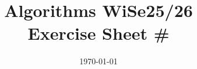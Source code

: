 \documentclass[11pt,a4paper]{article}
\title{
    \vspace{-2cm}
    \Large\textbf{Algorithms WiSe25/26}\\
    \large Exercise Sheet \#\exercisenum
    \vspace{-0.5cm}
}
\author{}  %
\date{\today}
\newcommand{\exercisenum}{X}
\begin{document}

\newcommand{\exercisetitle}[1]{%
    \newpage%
    \setcounter{page}{1}%
    \nolinenumbers%
    \thispagestyle{fancy}%
    {\centering\Large\textbf{Algorithms WiSe25/26}\par}%
    {\centering\large Exercise Sheet \#\exercisenum\par}%
    {\centering\normalsize\today\par}%
    \noindent\rule{\textwidth}{0.4pt}%
    \vspace{1em}%
    \section*{#1}%
    \resetlinenumber%
    \linenumbers%
}

\newcommand{\exercisepart}[1]{%
    \nolinenumbers%
    \subsection*{#1}%
    \linenumbers%
}


\end{document}
